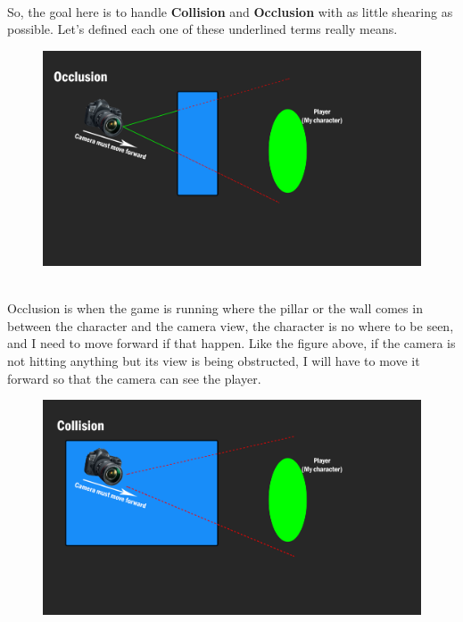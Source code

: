 \documentclass[a4paper, 13pt]{extarticle}
\begin{document}
  \\[0.15cm]
  So, the goal here is to handle {\bfseries Collision} and {\bfseries Occlusion} with as little shearing as possible. Let's defined each one of these underlined terms really means. 
  \begin{figure}[h]
  	\centering
  	\begin{minipage}{.4\textwidth}
  		\centering
  		\includegraphics[width=1.3\linewidth]{intructions/Occlusion_camera.png}
  		\centering
  		\label{fig:test10}
  	\end{minipage}
  \end{figure}
  \\[0.15cm]
  Occlusion is when the game is running where the pillar or the wall comes in between the character and the camera view, the character is no where to be seen, and I need to move forward if that happen. Like the figure above, if the camera is not hitting anything but its view is being obstructed, I will have to move it forward so that the camera can see the player.
  \begin{figure}[h]
  	\centering
  	\begin{minipage}{.4\textwidth}
  		\centering
  		\includegraphics[width=1.3\linewidth]{intructions/Collision_camera.png}
  		\centering
  		\label{fig:test11}
  	\end{minipage}
  \end{figure}
\end{document}
